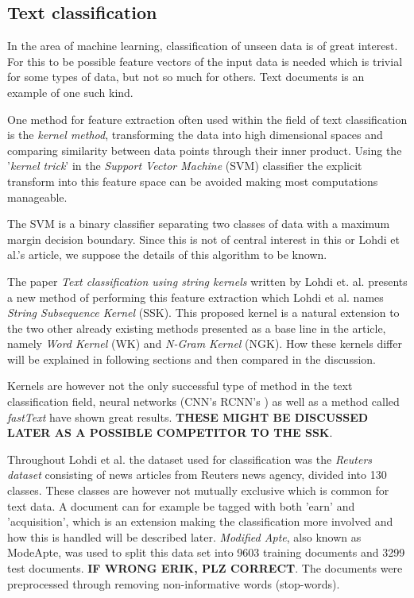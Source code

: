 \subsection{Text classification}
In the area of machine learning, classification of unseen data is of great interest. For this to be possible feature vectors of the input data is needed which is trivial for some types of data, but not so much for others. Text documents is an example of one such kind. 

One method for feature extraction often used within the field of text classification is the \textit{kernel method}, transforming the data into high dimensional spaces and comparing similarity between data points through their inner product. Using the '\textit{kernel trick}' in the \textit{Support Vector Machine} (SVM) classifier the explicit transform into this feature space can be avoided making most computations manageable. 

The SVM is a binary classifier separating two classes of data with a maximum margin decision boundary. Since this is not of central interest in this or Lohdi et al.'s article, we suppose the details of this algorithm to be known.

The paper \textit{Text classification using string kernels} written by Lohdi et. al. presents a new method of performing this feature extraction which Lohdi et al. names \textit{String Subsequence Kernel} (SSK). This proposed kernel is a natural extension to the two other already existing methods presented as a base line in the article, namely \textit{Word Kernel} (WK) and \textit{N-Gram Kernel} (NGK). How these kernels differ will be explained in following sections and then compared in the discussion. 

Kernels are however not the only successful type of method in the text classification field, neural networks (CNN's RCNN's ) as well as a method called \textit{fastText} have shown great results. \textbf{THESE MIGHT BE DISCUSSED LATER AS A POSSIBLE COMPETITOR TO THE SSK}.

Throughout Lohdi et al. the dataset used for classification was the \textit{Reuters dataset} consisting of news articles from Reuters news agency, divided into 130 classes. These classes are however not mutually exclusive which is common for text data. A document can for example be tagged with both 'earn' and 'acquisition', which is an extension making the classification more involved and how this is handled will be described later. \textit{Modified Apte}, also known as ModeApte, was used to split this data set into 9603 training documents and 3299 test documents. \textbf{IF WRONG ERIK, PLZ CORRECT}. The documents were preprocessed through removing non-informative words (stop-words).

